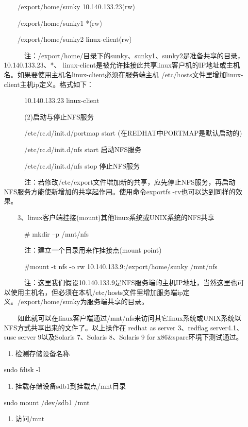 \documentclass[11pt]{article}
\begin{document}
\begin{enumerate}
　　/export/home/sunky 10.140.133.23(rw)

　　/export/home/sunky1 *(rw)

　　/export/home/sunky2 linux-client(rw)

　　　注：/export/home/目录下的sunky、sunky1、sunky2是准备共享的目录，10.140.133.23、*、 linux-client是被允许挂接此共享linux客户机的IP地址或主机名。如果要使用主机名linux-client必须在服务端主机 /etc/hosts文件里增加linux-client主机ip定义。格式如下：

　　　10.140.133.23 linux-client

　　　(2)启动与停止NFS服务

　　　/etc/rc.d/init.d/portmap start (在REDHAT中PORTMAP是默认启动的)

　　　/etc/rc.d/init.d/nfs start 启动NFS服务

　　　/etc/rc.d/init.d/nfs stop 停止NFS服务

　　　注：若修改/etc/export文件增加新的共享，应先停止NFS服务，再启动NFS服务方能使新增加的共享起作用。使用命令exportfs -rv也可以达到同样的效果。

　　3、linux客户端挂接(mount)其他linux系统或UNIX系统的NFS共享

　　　\# mkdir –p /mnt/nfs

　　　注：建立一个目录用来作挂接点(mount point)

　　　\#mount -t nfs -o rw 10.140.133.9:/export/home/sunky /mnt/nfs

　　　注：这里我们假设10.140.133.9是NFS服务端的主机IP地址，当然这里也可以使用主机名，但必须在本机/etc/hosts文件里增加服务端ip定义。/export/home/sunky为服务端共享的目录。

　　如此就可以在linux客户端通过/mnt/nfs来访问其它linux系统或UNIX系统以NFS方式共享出来的文件了。以上操作在 redhat as server 3、redflag server4.1、suse server 9以及Solaris 7、Solaris 8、Solaris 9 for x86\&sparc环境下测试通过。

\begin{enumerate}
\item 检测存储设备名称
\end{enumerate}
sudo fdisk -l

\begin{enumerate}
\item 挂载存储设备sdb1到挂载点/mnt目录
\end{enumerate}

sudo mount /dev/sdb1 /mnt

\begin{enumerate}
\item 访问/mnt


\end{enumerate}
\end{enumerate}
\end{document}
